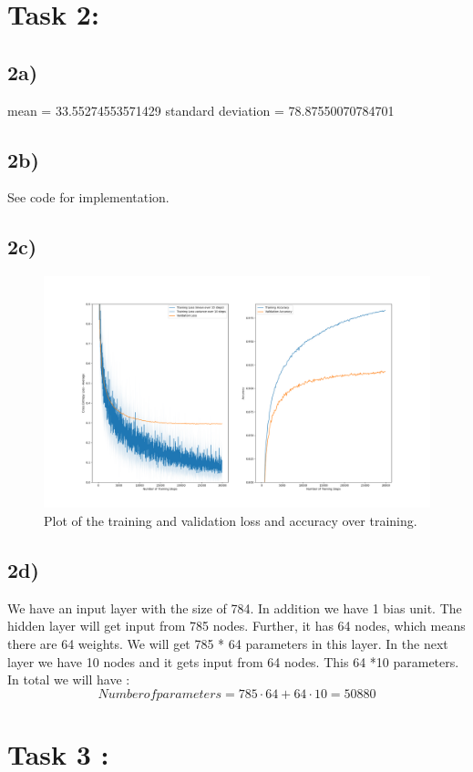 \documentclass{article}
\begin{document}
\section*{Task 2:}

\subsection*{2a)}

mean = 33.55274553571429 \newline
standard deviation  = 78.87550070784701

\subsection*{2b)}
See code for implementation.
\subsection*{2c)}

\begin{figure}[h!]
    \centering
    \includegraphics[width=\linewidth]{task2c_train_loss.png}
    \caption[short]{Plot of the training and validation loss and accuracy over training.}
\end{figure}


\subsection*{2d)}

We have an input layer with the size of 784. In addition we have 1 bias unit. The hidden layer will
get input from 785 nodes. Further, it has 64 nodes, which means there are 64 weights. We will 
get 785 * 64 parameters in this layer. In the next layer we have 10 nodes and it gets input from 64 nodes. This 64 *10 parameters.
In total we will have : \newline
\begin{equation}
    Number of parameters = 785 \cdot 64 + 64 \cdot 10 = 50880 
\end{equation}


\section*{Task 3 :}
\end{document}

